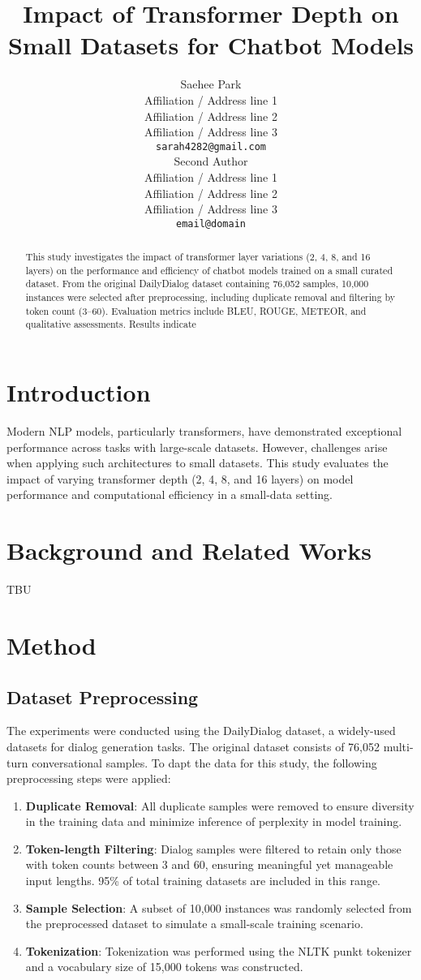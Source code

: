 \documentclass[11pt]{article}
\title{Impact of Transformer Depth on Small Datasets for Chatbot Models}
\author{Saehee Park\\
  Affiliation / Address line 1 \\
  Affiliation / Address line 2 \\
  Affiliation / Address line 3 \\
  \texttt{sarah4282@gmail.com} \\\And
  Second Author \\
  Affiliation / Address line 1 \\
  Affiliation / Address line 2 \\
  Affiliation / Address line 3 \\
  \texttt{email@domain} \\}
\begin{document}
\maketitle
\begin{abstract}
This study investigates the impact of transformer layer variations (2, 4, 8, and 16 layers) on the performance and efficiency of chatbot models trained on a small curated dataset. From the original DailyDialog dataset containing 76,052 samples, 10,000 instances were selected after preprocessing, including duplicate removal and filtering by token count (3–60). Evaluation metrics include BLEU, ROUGE, METEOR, and qualitative assessments. Results indicate 
\end{abstract}

\section{Introduction}

Modern NLP models, particularly transformers, have demonstrated exceptional performance across tasks with large-scale datasets. However, challenges arise when applying such architectures to small datasets. This study evaluates the impact of varying transformer depth (2, 4, 8, and 16 layers) on model performance and computational efficiency in a small-data setting.


\section{Background and Related Works}
TBU

\section{Method}
\subsection{Dataset Preprocessing}
The experiments were conducted using the DailyDialog dataset, a widely-used datasets for dialog generation tasks. The original dataset consists of 76,052 multi-turn conversational samples. To dapt the data for this study, the following preprocessing steps were applied:
    \begin{enumerate}
        \item \textbf{Duplicate Removal}: All duplicate samples were removed to ensure diversity in the training data and minimize inference of perplexity in model training.
        \item \textbf{Token-length Filtering}: Dialog samples were filtered to retain only those with token counts between 3 and 60, ensuring meaningful yet manageable input lengths. 95\% of total training datasets are included in this range.
        \item \textbf{Sample Selection}: A subset of 10,000 instances was randomly selected from the preprocessed dataset to simulate a small-scale training scenario.
        \item \textbf{Tokenization}: Tokenization was performed using the NLTK punkt tokenizer and a vocabulary size of 15,000 tokens was constructed.
    \end{enumerate}
\end{document}
